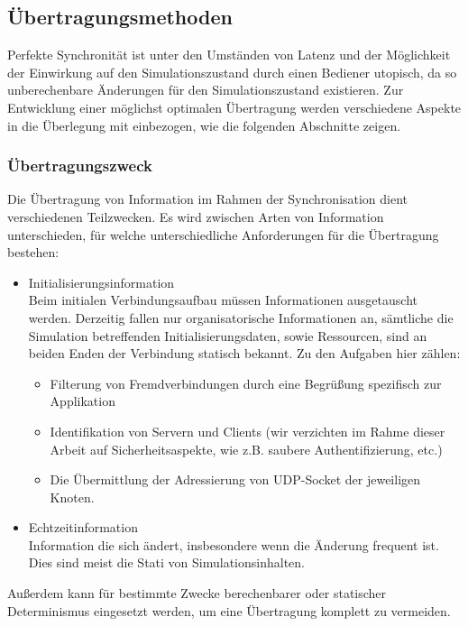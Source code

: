 \documentclass[11pt,twoside,a4paper]{article}
\begin{document}
\subsection{Übertragungsmethoden}
\label{sec:transmission_formats}
Perfekte Synchronität ist unter den Umständen von Latenz und der Möglichkeit der Einwirkung auf den Simulationszustand durch einen Bediener utopisch, da so unberechenbare Änderungen für den Simulationszustand existieren.
Zur Entwicklung einer möglichst optimalen Übertragung werden verschiedene Aspekte in die Überlegung mit einbezogen, wie die folgenden Abschnitte zeigen.

\subsubsection{Übertragungszweck}
Die Übertragung von Information im Rahmen der Synchronisation dient verschiedenen Teilzwecken.
Es wird zwischen Arten von Information unterschieden, für welche unterschiedliche Anforderungen für die Übertragung bestehen:
\begin{itemize}
\item Initialisierungsinformation\\
Beim initialen Verbindungsaufbau müssen Informationen ausgetauscht werden.
Derzeitig fallen nur organisatorische Informationen an, sämtliche die Simulation betreffenden Initialisierungsdaten, sowie Ressourcen, sind an beiden Enden der Verbindung statisch bekannt.
Zu den Aufgaben hier zählen:
\begin{itemize}
\item Filterung von Fremdverbindungen durch eine Begrüßung spezifisch zur Applikation
\item Identifikation von Servern und Clients (wir verzichten im Rahme dieser Arbeit auf Sicherheitsaspekte, wie z.B. saubere Authentifizierung, etc.)
\item Die Übermittlung der Adressierung von UDP-Socket der jeweiligen Knoten.
\end{itemize}
\item Echtzeitinformation\\
Information die sich ändert, insbesondere wenn die Änderung frequent ist.
Dies sind meist die Stati von Simulationsinhalten.
\end{itemize}

Außerdem kann für bestimmte Zwecke berechenbarer oder statischer Determinismus eingesetzt werden, um eine Übertragung komplett zu vermeiden.
\end{document}
